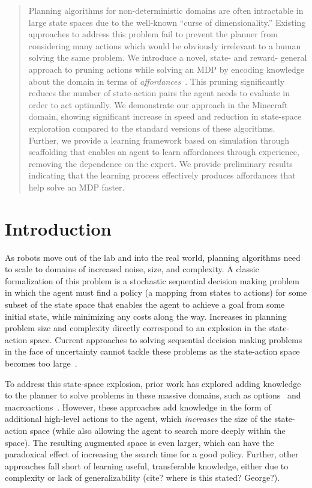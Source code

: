 \documentclass[conference]{IEEEtran}
\begin{document}
\begin{abstract}
Planning algorithms for non-deterministic domains are often
intractable in large state spaces due to the well-known ``curse of
dimensionality.'' Existing approaches to address this problem fail to
prevent the planner from considering many actions which would be
obviously irrelevant to a human solving the same problem. We
introduce a novel, state- and reward- general approach to pruning
actions while solving an MDP by encoding knowledge about the
domain in terms of {\em affordances}~\citep{gibson77}. This pruning 
significantly reduces the number of state-action pairs the agent needs 
to evaluate in order to act optimally. We demonstrate our approach 
in the Minecraft domain, showing significant increase in speed and 
reduction in state-space exploration compared to the standard 
versions of these algorithms. Further, we provide a learning framework
based on simulation through scaffolding that enables an agent
to learn affordances through experience, removing the dependence
on the expert. We provide preliminary results indicating that the learning
process effectively produces affordances that help solve an MDP faster.
\end{abstract}

\IEEEpeerreviewmaketitle

\section{Introduction}
\label{sec:introduction}
As robots move out of the lab and into the real world, planning
algorithms need to scale to domains of increased noise, size, and
complexity.  A classic formalization of this problem is a stochastic
sequential decision making problem in which the agent must find a
policy (a mapping from states to actions) for some subset of the state
space that enables the agent to achieve a goal from some initial
state, while minimizing any costs along the way.
Increases in planning problem size and complexity directly correspond
to an explosion in the state-action space. Current approaches to solving 
sequential decision making problems in the face of uncertainty cannot tackle these problems 
as the state-action space becomes too large~\citep{grounds05}.

To address this state-space explosion, prior work has explored adding
knowledge to the planner to solve problems in these
massive domains, such as options~\citep{sutton99} and
macroactions~\citep{Botea:2005kx,Newton:2005vn}. However, these
approaches add knowledge in the form of additional high-level actions
to the agent, which {\em increases} the size of the state-action space
(while also allowing the agent to search more deeply within the
space).  The resulting augmented space is even larger, which can have
the paradoxical effect of increasing the search time for a good
policy. Further, other approaches fall short of learning useful, transferable knowledge,
either due to complexity or lack of generalizability (cite? where is this stated? George?).
\end{document}
